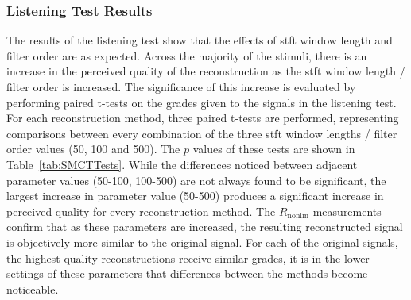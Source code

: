 %
%
		\subsubsection*{Listening Test Results}
			The results of the listening test show that the effects of \acrshort{stft} window length and filter
			order are as expected. Across the majority of the stimuli, there is an increase in the perceived
			quality of the reconstruction as the \acrshort{stft} window length / filter order is increased. The
			significance of this increase is evaluated by performing paired t-tests on the grades given to the
			signals in the listening test. For each reconstruction method, three paired t-tests are performed,
			representing comparisons between every combination of the three \acrshort{stft} window lengths /
			filter order values (50, 100 and 500). The $p$ values of these tests are shown in
			Table~\ref{tab:SMCTTests}. While the differences noticed between adjacent parameter values (50-100,
			100-500) are not always found to be significant, the largest increase in parameter value (50-500)
			produces a significant increase in perceived quality for every reconstruction method. The
			$R_{\mathrm{nonlin}}$ measurements confirm that as these parameters are increased, the resulting
			reconstructed signal is objectively more similar to the original signal. For each of the original
			signals, the highest quality reconstructions receive similar grades, it is in the lower settings of
			these parameters that differences between the methods become noticeable.

